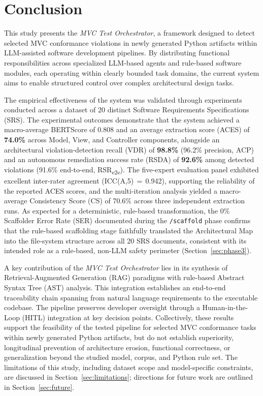 \section{Conclusion}
\label{sec:conclusion}

This study presents the \textit{MVC Test Orchestrator}, a framework
designed to detect selected MVC conformance violations in newly generated Python artifacts
within LLM-assisted software development pipelines. By distributing functional responsibilities across specialized LLM-based agents and rule-based software modules, each operating within clearly bounded task domains, the current system aims to enable structured control over complex architectural design tasks.

The empirical effectiveness of the system was validated through 
experiments conducted across a dataset of 20 distinct Software 
Requirements Specifications (SRS). The experimental outcomes demonstrate
that the system achieved a macro-average BERTScore of 0.808 and an average extraction score (ACES) of \textbf{74.0\%}
across Model, View, and Controller components, alongside an architectural
violation-detection recall (VDR) of \textbf{98.8\%} (96.2\% precision, ACP) and an
autonomous remediation success rate (RSDA) of \textbf{92.6\%} among detected
violations (91.6\% end-to-end, RSR\textsubscript{e2e}). The five-expert evaluation panel exhibited excellent
inter-rater agreement (ICC(A,5)\,$=$\,0.942), supporting the reliability of the reported ACES scores, and
the multi-iteration analysis yielded a macro-average Consistency Score (CS) of 70.6\% across three
independent extraction runs. As expected for a deterministic,
rule-based transformation, the $0\%$ Scaffolder
Error Rate (SER) documented during the \texttt{/scaffold} phase confirms
that the rule-based scaffolding stage faithfully translated the
Architectural Map into the file-system structure across all 20 SRS
documents, consistent with its intended role as a rule-based, non-LLM
safety perimeter (Section~\ref{sec:phase3}).

A key contribution of the \textit{MVC Test Orchestrator} lies in its synthesis of
Retrieval-Augmented Generation (RAG) paradigms with rule-based Abstract
Syntax Tree (AST) analysis. This integration establishes an end-to-end
traceability chain spanning from natural language
requirements to the executable codebase. The pipeline preserves developer oversight through a Human-in-the-Loop (HITL) integration at key decision points. Collectively, these results support the feasibility of the tested pipeline for selected MVC conformance tasks within newly generated Python artifacts, but do not establish superiority, longitudinal prevention of architecture erosion, functional correctness, or generalization beyond the studied model, corpus, and Python rule set. The 
limitations of this study, including dataset scope and model-specific 
constraints, are discussed in Section~\ref{sec:limitations}; directions 
for future work are outlined in Section~\ref{sec:future}.